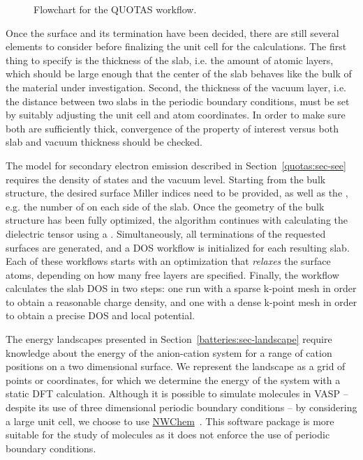 \begin{refsection}
\begin{figure}[!ht] 
 
\caption{\label{automation:fig-quotas} Flowchart for the \gls{QUOTAS} workflow.} 
\end{figure} 

Once the surface and its termination have been decided, there are still 
several elements to consider before finalizing the unit cell for the 
calculations. The first thing to specify is the thickness of the slab, i.e. 
the amount of atomic layers, which should be large enough that the center of 
the slab behaves like the bulk of the material under investigation. Second, 
the thickness of the vacuum layer, i.e. the distance between two slabs in the 
periodic boundary conditions, must be set by suitably adjusting the unit cell 
and atom coordinates. In order to make sure both are sufficiently thick, 
convergence of the property of interest versus both slab and vacuum thickness 
should be checked. 
 
The model for secondary electron emission described in 
Section~\ref{quotas:sec-see} requires the density of states and the vacuum level. 
Starting from the bulk structure, the desired surface Miller indices need to 
be provided, as well as the , e.g. the number of 
 on each side of the slab. Once the geometry of the bulk 
structure has been fully optimized, the algorithm continues with calculating 
the dielectric tensor using a . Simultaneously, all 
terminations of the requested surfaces are generated, and a \gls{DOS} workflow is 
initialized for each resulting slab. Each of these workflows starts with an 
optimization that \textit{relaxes} the surface atoms, depending on how many 
free layers are specified. Finally, the workflow calculates the slab \gls{DOS} in 
two steps: one run with a sparse k-point mesh in order to obtain a reasonable 
charge density, and one with a dense k-point mesh in order to obtain a precise 
DOS and local potential. 
 


The energy landscapes presented in Section~\ref{batteries:sec-landscape} require 
knowledge about the energy of the anion-cation system for a range of cation 
positions on a two dimensional surface. We represent the landscape as a grid of 
points or coordinates, for which we determine the energy of the system with a 
static \gls{DFT} calculation. Although it is possible to simulate molecules in \gls{VASP} 
-- despite its use of three dimensional periodic boundary conditions -- by 
considering a large unit cell, we choose to use 
\href{http://www.nwchem-sw.org/index.php/Main_Page}{NWChem}~\cite{Valiev2010}. 
This software package is more suitable for the study of molecules as it does 
not enforce the use of periodic boundary conditions. 


\end{refsection}
